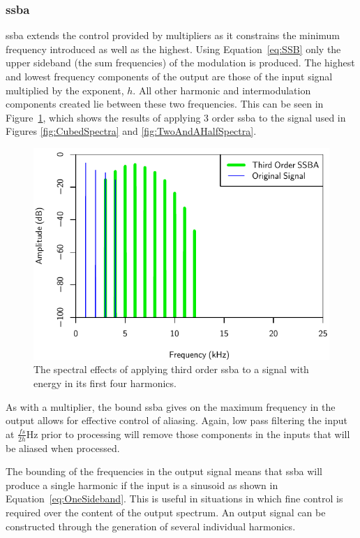 		\subsubsection*{\acrshort{ssba}}
			\acrshort{ssba} extends the control provided by multipliers as it constrains the minimum frequency
			introduced as well as the highest. Using Equation~\ref{eq:SSB} only the upper sideband (the sum
			frequencies) of the modulation is produced. The highest and lowest frequency components of the
			output are those of the input signal multiplied by the exponent, $h$. All other harmonic and
			intermodulation components created lie between these two frequencies. This can be seen in
			Figure~\ref{fig:SSBA3Spectra}, which shows the results of applying $3$ order
			\acrshort{ssba} to the signal used in Figures \ref{fig:CubedSpectra} and
			\ref{fig:TwoAndAHalfSpectra}. 
			
			\begin{figure}[h!]
				\centering
				\includegraphics{chapter5/Images/SSBA3Spectra.pdf}
				\caption{The spectral effects of applying third order \acrshort{ssba} to a signal with
					 energy in its first four harmonics.}
				\label{fig:SSBA3Spectra}
			\end{figure}

			As with a multiplier, the bound \acrshort{ssba} gives on the maximum frequency in the output allows
			for effective control of aliasing. Again, low pass filtering the input at $\frac{fs}{2h}$Hz prior
			to processing will remove those components in the inputs that will be aliased when processed.

			The bounding of the frequencies in the output signal means that \acrshort{ssba} will produce a
			single harmonic if the input is a sinusoid as shown in Equation~\ref{eq:OneSideband}. This is
			useful in situations in which fine control is required over the content of the output spectrum. An
			output signal can be constructed through the generation of several individual harmonics.

